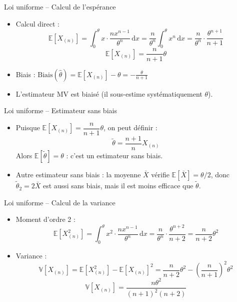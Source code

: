 \documentclass[11pt,aspectratio=169]{beamer}
\newcommand{\dd}{\mathrm{d}}
\begin{document}
\begin{frame}{Loi uniforme -- Calcul de l'espérance}

\begin{itemize}

\item Calcul direct :
  \[
  \mathbb{E}[X_{(n)}] = \int_0^\theta x \cdot \frac{n x^{n-1}}{\theta^n} \, \dd x = \frac{n}{\theta^n} \int_0^\theta x^n \, \dd x = \frac{n}{\theta^n} \cdot \frac{\theta^{n+1}}{n+1}
  \]
  \[
  \boxed{\mathbb{E}[X_{(n)}] = \frac{n}{n+1}\theta}
  \]

\item Biais : $\text{Biais}(\hat{\theta}) = \mathbb{E}[X_{(n)}] - \theta = -\frac{\theta}{n+1}$\newline

\item L'estimateur MV est biaisé (il sous-estime systématiquement $\theta$).

\end{itemize}

\end{frame}

\begin{frame}{Loi uniforme -- Estimateur sans biais}

\begin{itemize}

\item Puisque $\mathbb{E}[X_{(n)}] = \dfrac{n}{n+1}\theta$, on peut définir :
  \[
  \boxed{\tilde{\theta} = \frac{n+1}{n} X_{(n)}}
  \]
  Alors $\mathbb{E}[\tilde{\theta}] = \theta$ : c'est un estimateur sans biais.\newline

\item Autre estimateur sans biais : la moyenne $\bar{X}$ vérifie $\mathbb{E}[\bar{X}] = \theta/2$, donc $\tilde{\theta}_2 = 2\bar{X}$ est aussi sans biais, mais il est moins efficace que $\tilde{\theta}$.

\end{itemize}

\end{frame}

\begin{frame}{Loi uniforme -- Calcul de la variance}

\begin{itemize}

\item Moment d'ordre 2 :
  \[
  \mathbb{E}[X_{(n)}^2] = \int_0^\theta x^2 \cdot \frac{n x^{n-1}}{\theta^n} \, \dd x = \frac{n}{\theta^n} \cdot \frac{\theta^{n+2}}{n+2} = \frac{n}{n+2}\theta^2
  \]

\item Variance :
  \[
  \mathbb{V}[X_{(n)}] = \mathbb{E}[X_{(n)}^2] - \mathbb{E}[X_{(n)}]^2 = \frac{n}{n+2}\theta^2 - \left(\frac{n}{n+1}\right)^2 \theta^2
  \]
  \[
  \boxed{\mathbb{V}[X_{(n)}] = \frac{n\theta^2}{(n+1)^2(n+2)}}
  \]

\end{itemize}

\end{frame}
\end{document}

